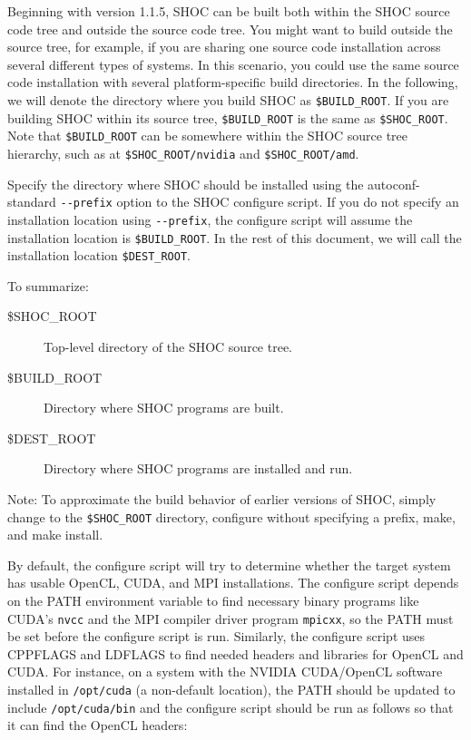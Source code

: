 \documentclass[11pt]{article}
\begin{document}
Beginning with version 1.1.5, SHOC can be built both within the SHOC source 
code tree and outside the source code tree.
You might want to build outside the source tree, for example, if you are 
sharing one source code installation across several different types of systems.
In this scenario, you could use the same source code installation with 
several platform-specific build directories.
In the following, we will denote the directory where you build SHOC 
as \verb+$BUILD_ROOT+.
If you are building SHOC within its source tree, \verb+$BUILD_ROOT+ is
the same as \verb+$SHOC_ROOT+.
Note that \verb+$BUILD_ROOT+ can be somewhere within the SHOC source tree
hierarchy, such as at \verb+$SHOC_ROOT/nvidia+ and \verb+$SHOC_ROOT/amd+.

Specify the directory where SHOC should be installed using the 
autoconf-standard \verb+--prefix+ option to the SHOC configure script.
If you do not specify an installation location using \verb+--prefix+, the
configure script will assume the installation location is \verb+$BUILD_ROOT+.
In the rest of this document, we will call the installation location
\verb+$DEST_ROOT+.

To summarize:
\begin{description}
\item [\$SHOC\_ROOT] Top-level directory of the SHOC source tree.
\item [\$BUILD\_ROOT] Directory where SHOC programs are built.
\item [\$DEST\_ROOT] Directory where SHOC programs are installed and run.
\end{description}

\begin{framed}
Note: To approximate the build behavior of earlier versions of SHOC,
simply change to the \verb+$SHOC_ROOT+ directory, configure without specifying a
prefix, make, and make install.
\end{framed}

By default, the configure script will try to determine whether the 
target system has usable OpenCL, CUDA, and MPI installations.  
The configure script depends on the PATH environment variable to find necessary
binary programs like CUDA's \verb+nvcc+ and the MPI compiler driver
program \verb+mpicxx+, so the PATH must be set before the configure script is
run.
Similarly, the configure script uses CPPFLAGS and LDFLAGS to find needed
headers and libraries for OpenCL and CUDA.
For instance, on a system with the NVIDIA CUDA/OpenCL software installed
in \verb+/opt/cuda+ (a non-default location), the PATH should be updated to include
\verb+/opt/cuda/bin+ and the configure script should be run as follows so that it can
find the OpenCL headers:
\end{document}
